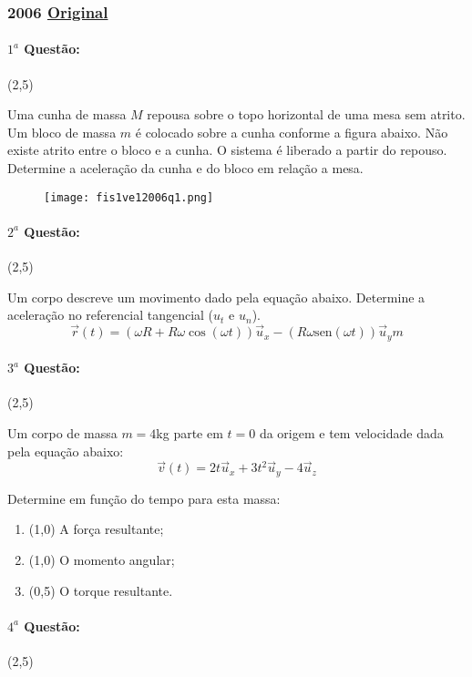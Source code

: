 \documentclass[12pt,a4paper]{article}
\newcommand{\sen}{\mathrm{sen}}
\newcommand{\original}[1]{\tiny \href{#1}{Original} \normalsize}
\begin{document}
\newpage

\subsubsection{2006 \original{https://drive.google.com/file/d/1iLMci1L1dNk1WOM2tlaP4YxsDUP-H7J8/view?usp=sharing}}
\paragraph{$1^a$ Questão:} (2,5) 

Uma cunha de massa $M$ repousa sobre o topo horizontal de uma mesa sem atrito. Um bloco de massa $m$ é colocado sobre a cunha
conforme a figura abaixo. Não existe atrito entre o bloco e a cunha. O sistema é liberado a partir do repouso. Determine a aceleração
da cunha e do bloco em relação a mesa.

\begin{figure}[ht]
\centering
\texttt{[image: fis1ve12006q1.png]}
\end{figure}

\paragraph{$2^a$ Questão:} (2,5) 

Um corpo descreve um movimento dado pela equação abaixo. Determine a aceleração no referencial tangencial ($u_t$ e $u_n$).
$$ \overrightarrow{r}(t) = (\omega R + R\omega \cos (\omega t))\overrightarrow{u}_x-(R\omega\sen(\omega t))\overrightarrow{u}_ym $$
\paragraph{$3^a$ Questão:} (2,5) 

Um corpo de massa $m=4$kg parte em $t=0$ da origem e tem velocidade dada pela equação abaixo:
$$ \overrightarrow{v}(t)=2t\overrightarrow{u}_x+3t^2\overrightarrow{u}_y-4\overrightarrow{u}_z$$

Determine em função do tempo para esta massa:

\begin{enumerate}[label=\alph*)]
\item (1,0) A força resultante;
\item (1,0) O momento angular;
\item (0,5) O torque resultante.
\end{enumerate}

\paragraph{$4^a$ Questão:} (2,5)
\end{document}
